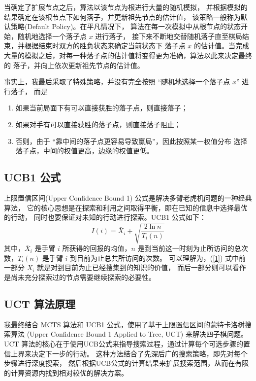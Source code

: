 \documentclass[UTF8]{ctexart}
\begin{document}
当确定了扩展节点之后，算法以该节点为根进行大量的随机模拟，
并根据模拟的结果确定在该根节点下如何落子，并更新祖先节点的估计值，
该策略一般称为默认策略(Default Policy)。在平凡情况下，
算法在每一次模拟中从根节点的状态开始，随机地选择一个落子点 $x$ 进行落子，
接下来不断地交替随机落子直至棋局结束，并根据结束时双方的胜负状态来确定当前状态下
落子点 $x$ 的估计值。当完成大量的模拟之后，对每一种落子点的估计值将变得更为准确，算法以此来决定最终的
落子，并向上依次更新祖先节点的估计值。

事实上，我最后采取了特殊策略，并没有完全按照 ``随机地选择一个落子点 $x$'' 进行落子，
而是

\begin{enumerate}
    \item 如果当前局面下有可以直接获胜的落子点，则直接落子；
    \item 如果对手有可以直接获胜的落子点，则直接落子阻止；
    \item 否则，由于 ``靠中间的落子点更容易导致赢局''，因此按照某一权值分布
            选择落子点，中间的权值更高，边缘的权值更低。
\end{enumerate}

\subsection{UCB1 公式}

上限置信区间(Upper Confidence Bound 1) 公式是解决多臂老虎机问题的一种经典算法，
它的核心思想是在探索和利用之间取得平衡，即在已知的信息中选择最优的行动，
同时也要保证对未知的行动进行探索。UCB1 公式如下：
\begin{equation}
    I(i) = \bar{X}_i + \sqrt{\frac{2\ln n}{T_i(n)}} \label{1}
\end{equation}
其中，$\bar{X}_i$ 是手臂 $i$ 所获得的回报的均值，$n$ 是到当前这一时刻为止所访问的总次
数，$T_i(n)$ 是手臂 $i$ 到目前为止总共所访问的次数。
可以理解为，(\ref{1}) 式中前一部分 $X_i$ 就是对到目前为止已经搜集到的知识的价值，
而后一部分则可以看作是尚未充分探索过的节点需要继续探索的必要性。

\subsection{UCT 算法原理}

我最终结合 MCTS 算法和 UCB1 公式，使用了基于上限置信区间的蒙特卡洛树搜索算法
(Upper Confidence Bound 1 Applied to Tree, UCT) 来解决四子棋问题。
UCT 算法的核心在于使用UCB公式来指导搜索过程，通过计算每个可选步骤的置信上界来决定下一步的行动。
这种方法结合了先深后广的搜索策略，即先对每个步骤进行深度搜索，
然后根据UCB公式的计算结果来扩展搜索范围，从而在有限的计算资源内找到相对较优的解决方案。 
\end{document}
